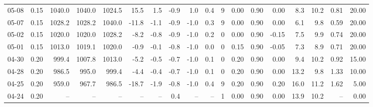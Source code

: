 \begin{threeparttable}
{\begin{tabular}{lrrrrrrrrrrrrrrrrr}
  05-08 &     0.15 & 1040.0 & 1040.0 & 1024.5 &       15.5 &            1.5 &                      -0.9 &                      1.0 &                 0.4 &              9 &       0.00 &      0.90 &           0.00 &              8.3 &                10.2 &            0.81 &                  20.00 \\
  05-07 &     0.15 & 1028.2 & 1028.2 & 1040.0 &      -11.8 &           -1.1 &                      -0.9 &                     -1.0 &                 0.3 &              9 &       0.00 &      0.90 &           0.00 &              6.1 &                 9.8 &            0.59 &                  20.00 \\
  05-02 &     0.15 & 1020.0 & 1020.0 & 1028.2 &       -8.2 &           -0.8 &                      -0.9 &                     -1.0 &                 0.2 &              0 &       0.00 &      0.90 &          -0.15 &              7.5 &                 9.9 &            0.74 &                  20.00 \\
  05-01 &     0.15 & 1013.0 & 1019.1 & 1020.0 &       -0.9 &           -0.1 &                      -0.8 &                     -1.0 &                 0.0 &              0 &       0.15 &      0.90 &          -0.05 &              7.3 &                 8.9 &            0.71 &                  20.00 \\
  04-30 &     0.20 &  999.4 & 1007.8 & 1013.0 &       -5.2 &           -0.5 &                      -0.7 &                     -1.0 &                 0.1 &              0 &       0.20 &      0.90 &           0.00 &              9.4 &                10.2 &            0.92 &                  15.00 \\
  04-28 &     0.20 &  986.5 &  995.0 &  999.4 &       -4.4 &           -0.4 &                      -0.7 &                     -1.0 &                 0.1 &              0 &       0.20 &      0.90 &           0.00 &             13.2 &                 9.8 &            1.33 &                  10.00 \\
  04-25 &     0.20 &  959.0 &  967.7 &  986.5 &      -18.7 &           -1.9 &                      -0.8 &                     -1.0 &                 0.4 &              9 &       0.20 &      0.90 &           0.20 &             16.0 &                11.2 &            1.62 &                   5.00 \\
  04-24 &     0.20 &     -- &     -- &     -- &         -- &             -- &                       0.4 &                       -- &                  -- &              1 &       0.00 &      0.90 &           0.00 &             13.9 &                10.2 &              -- &                   0.00 \\

\end{tabular}}
\end{threeparttable}
